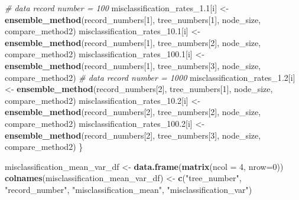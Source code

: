 \documentclass[
]{article}
\newenvironment{Shaded}{\begin{snugshade}}{\end{snugshade}}
\newcommand{\AttributeTok}[1]{\textcolor[rgb]{0.13,0.29,0.53}{#1}}
\newcommand{\CommentTok}[1]{\textcolor[rgb]{0.56,0.35,0.01}{\textit{#1}}}
\newcommand{\DecValTok}[1]{\textcolor[rgb]{0.00,0.00,0.81}{#1}}
\newcommand{\FloatTok}[1]{\textcolor[rgb]{0.00,0.00,0.81}{#1}}
\newcommand{\FunctionTok}[1]{\textcolor[rgb]{0.13,0.29,0.53}{\textbf{#1}}}
\newcommand{\NormalTok}[1]{#1}
\newcommand{\OtherTok}[1]{\textcolor[rgb]{0.56,0.35,0.01}{#1}}
\newcommand{\StringTok}[1]{\textcolor[rgb]{0.31,0.60,0.02}{#1}}
\begin{document}
\begin{Shaded}
\begin{Highlighting}[]
  \CommentTok{\# data record number = 100}
\NormalTok{  misclassification\_rates\_1}\FloatTok{.1}\NormalTok{[i] }\OtherTok{\textless{}{-}} \FunctionTok{ensemble\_method}\NormalTok{(record\_numbers[}\DecValTok{1}\NormalTok{], }
\NormalTok{                                                 tree\_numbers[}\DecValTok{1}\NormalTok{], node\_size, }
\NormalTok{                                                 compare\_method2)}
\NormalTok{  misclassification\_rates\_10}\FloatTok{.1}\NormalTok{[i] }\OtherTok{\textless{}{-}} \FunctionTok{ensemble\_method}\NormalTok{(record\_numbers[}\DecValTok{1}\NormalTok{], }
\NormalTok{                                                  tree\_numbers[}\DecValTok{2}\NormalTok{], node\_size, }
\NormalTok{                                                  compare\_method2)}
\NormalTok{  misclassification\_rates\_100}\FloatTok{.1}\NormalTok{[i] }\OtherTok{\textless{}{-}} \FunctionTok{ensemble\_method}\NormalTok{(record\_numbers[}\DecValTok{1}\NormalTok{], }
\NormalTok{                                                   tree\_numbers[}\DecValTok{3}\NormalTok{], node\_size, }
\NormalTok{                                                compare\_method2)}
  \CommentTok{\# data record number = 1000}
\NormalTok{  misclassification\_rates\_1}\FloatTok{.2}\NormalTok{[i] }\OtherTok{\textless{}{-}} \FunctionTok{ensemble\_method}\NormalTok{(record\_numbers[}\DecValTok{2}\NormalTok{], }
\NormalTok{                                                 tree\_numbers[}\DecValTok{1}\NormalTok{], node\_size, }
\NormalTok{                                                 compare\_method2)}
\NormalTok{  misclassification\_rates\_10}\FloatTok{.2}\NormalTok{[i] }\OtherTok{\textless{}{-}} \FunctionTok{ensemble\_method}\NormalTok{(record\_numbers[}\DecValTok{2}\NormalTok{], }
\NormalTok{                                                  tree\_numbers[}\DecValTok{2}\NormalTok{], node\_size, }
\NormalTok{                                                  compare\_method2)}
\NormalTok{  misclassification\_rates\_100}\FloatTok{.2}\NormalTok{[i] }\OtherTok{\textless{}{-}} \FunctionTok{ensemble\_method}\NormalTok{(record\_numbers[}\DecValTok{2}\NormalTok{], }
\NormalTok{                                                   tree\_numbers[}\DecValTok{3}\NormalTok{], node\_size, }
\NormalTok{                                                compare\_method2)}
\NormalTok{\}}

\NormalTok{misclassification\_mean\_var\_df }\OtherTok{\textless{}{-}} \FunctionTok{data.frame}\NormalTok{(}\FunctionTok{matrix}\NormalTok{(}\AttributeTok{ncol =} \DecValTok{4}\NormalTok{, }\AttributeTok{nrow=}\DecValTok{0}\NormalTok{))}
\FunctionTok{colnames}\NormalTok{(misclassification\_mean\_var\_df) }\OtherTok{\textless{}{-}} \FunctionTok{c}\NormalTok{(}\StringTok{"tree\_number"}\NormalTok{, }\StringTok{"record\_number"}\NormalTok{, }\StringTok{"misclassification\_mean"}\NormalTok{, }\StringTok{"misclassification\_var"}\NormalTok{) }


\end{Highlighting}
\end{Shaded}
\end{document}
